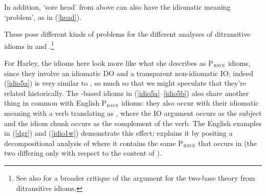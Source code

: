 \documentclass[output=paper,colorlinks,citecolor=brown]{langscibook}
\begin{document}

\noindent In addition,  `sore head' from above can also have the idiomatic meaning `problem', as in (\ref{head}).


\noindent These pose different kinds of problems for the different analyses of ditransitive idioms in \citet{gt:Harley:2002a} and \citet{gt:Bruening:2010a}.\footnote{See also \citet{gt:Larson:2017} for a broader critique of the argument for the two-base theory from ditransitive idioms.}

For Harley, the idioms here look more like what she describes as P$_{\textsc{have}}$ idioms, since they involve an idiomatic DO and a transparent non-idiomatic IO; indeed (\ref{idio5a}) is very similar to , so much so that we might speculate that they're related historically. The -based idioms in (\ref{idio5a}--\ref{idio5b}) also share another thing in common with English P$_{\textsc{have}}$ idioms: they also occur with their idiomatic meaning with a verb translating as , where the IO argument occurs as the subject and the idiom chunk occurs as the complement of the verb. The English examples in (\ref{dgr}) and (\ref{idio1w}) demonstrate this effect; \citet{gt:Richards:2001} explains it by positing a decompositional analysis of  where it contains the same P$_{\textsc{have}}$  that occurs in  (the two differing only with respect to the content of ). 
\end{document}
